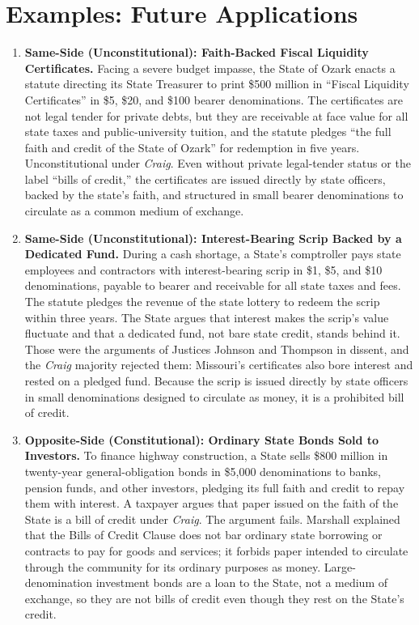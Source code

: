 \documentclass[12pt]{article}
\begin{document}
\section{Examples: Future Applications}
\begin{enumerate}

\item \textbf{Same-Side (Unconstitutional): Faith-Backed Fiscal Liquidity Certificates.} Facing a severe budget impasse, the State of Ozark enacts a statute directing its State Treasurer to print \$500 million in ``Fiscal Liquidity Certificates'' in \$5, \$20, and \$100 bearer denominations. The certificates are not legal tender for private debts, but they are receivable at face value for all state taxes and public-university tuition, and the statute pledges ``the full faith and credit of the State of Ozark'' for redemption in five years. Unconstitutional under \textit{Craig}. Even without private legal-tender status or the label ``bills of credit,'' the certificates are issued directly by state officers, backed by the state's faith, and structured in small bearer denominations to circulate as a common medium of exchange.

\item \textbf{Same-Side (Unconstitutional): Interest-Bearing Scrip Backed by a Dedicated Fund.} During a cash shortage, a State's comptroller pays state employees and contractors with interest-bearing scrip in \$1, \$5, and \$10 denominations, payable to bearer and receivable for all state taxes and fees. The statute pledges the revenue of the state lottery to redeem the scrip within three years. The State argues that interest makes the scrip's value fluctuate and that a dedicated fund, not bare state credit, stands behind it. Those were the arguments of Justices Johnson and Thompson in dissent, and the \textit{Craig} majority rejected them: Missouri's certificates also bore interest and rested on a pledged fund. Because the scrip is issued directly by state officers in small denominations designed to circulate as money, it is a prohibited bill of credit.

\item \textbf{Opposite-Side (Constitutional): Ordinary State Bonds Sold to Investors.} To finance highway construction, a State sells \$800 million in twenty-year general-obligation bonds in \$5,000 denominations to banks, pension funds, and other investors, pledging its full faith and credit to repay them with interest. A taxpayer argues that paper issued on the faith of the State is a bill of credit under \textit{Craig}. The argument fails. Marshall explained that the Bills of Credit Clause does not bar ordinary state borrowing or contracts to pay for goods and services; it forbids paper intended to circulate through the community for its ordinary purposes as money. Large-denomination investment bonds are a loan to the State, not a medium of exchange, so they are not bills of credit even though they rest on the State's credit.


\end{enumerate}
\end{document}
